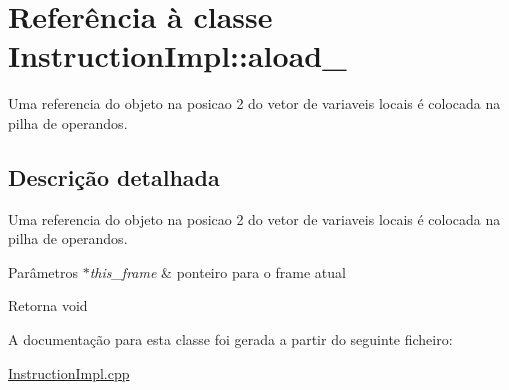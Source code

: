 \hypertarget{class_instruction_impl_1_1aload__2}{}\section{Referência à classe Instruction\+Impl\+:\+:aload\+\_}
\label{class_instruction_impl_1_1aload__2}


Uma referencia do objeto na posicao 2 do vetor de variaveis locais é colocada na pilha de operandos.  




\subsection{Descrição detalhada}
Uma referencia do objeto na posicao 2 do vetor de variaveis locais é colocada na pilha de operandos. 


\begin{DoxyParams}{Parâmetros}
{\em $\ast$this\+\_\+frame} & ponteiro para o frame atual \\
\hline
\end{DoxyParams}
\begin{DoxyReturn}{Retorna}
void 
\end{DoxyReturn}


A documentação para esta classe foi gerada a partir do seguinte ficheiro\+:\begin{DoxyCompactItemize}
\item 
\hyperlink{_instruction_impl_8cpp}{Instruction\+Impl.\+cpp}\end{DoxyCompactItemize}
